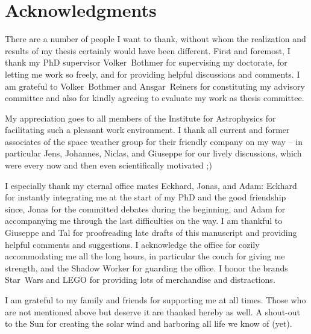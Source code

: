 
\chapter*{Acknowledgments}

There are a number of people I want to thank, without whom the realization and results of my thesis certainly would have been different.
First and foremost, I thank my PhD supervisor Volker~Bothmer for supervising my doctorate, for letting me work so freely, and for providing helpful discussions and comments.
I am grateful to Volker~Bothmer and Ansgar~Reiners for constituting my advisory committee and also for kindly agreeing to evaluate my work as thesis committee.

My appreciation goes to all members of the Institute for Astrophysics for facilitating such a pleasant work environment.
I thank all current and former associates of the space weather group for their friendly company on my way -- in particular Jens, Johannes, Niclas, and Giuseppe for our lively discussions, which were every now and then even scientifically motivated ;)

I especially thank my eternal office mates Eckhard, Jonas, and Adam:
Eckhard for instantly integrating me at the start of my PhD and the good friendship since,
Jonas for the committed debates during the beginning,
and Adam for accompanying me through the last difficulties on the way.
I am thankful to Giuseppe and Tal for proofreading late drafts of this manuscript and providing helpful comments and suggestions.
I acknowledge the office for cozily accommodating me all the long hours, in particular the couch for giving me strength, and the Shadow Worker for guarding the office. I honor the brands Star~Wars and LEGO for providing lots of merchandise and distractions.

I am grateful to my family and friends for supporting me at all times.
Those who are not mentioned above but deserve it are thanked hereby as well.
A shout-out to the Sun for creating the solar wind and harboring all life we know of (yet).




